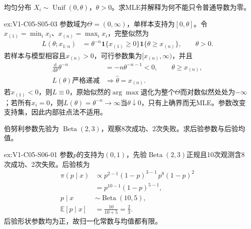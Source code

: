 \begin{SLChapterExercisePairSection}
\begin{exercise}\label{ex:V1-C05-S05-03}
均匀分布 $X_i\sim\operatorname{Unif}(0,\theta)$，$\theta>0$。求MLE并解释为何不能只令普通导数为零。
\end{exercise}
\label{sol:V1-C05-S05-03}
\begin{chapterexercisesolution}{ex:V1-C05-S05-03}
参数域为$\Theta=(0,\infty)$，单样本支持为$[0,\theta]$。令$x_{(1)}=\min_i x_i$、$x_{(n)}=\max_i x_i$，完整似然为
\[
\begin{aligned}
L(\theta;x_{1:n})
&=\theta^{-n}\mathbf1\{x_{(1)}\ge0\}
\mathbf1\{\theta\ge x_{(n)}\},\qquad \theta>0.
\end{aligned}
\]
若样本与模型相容且$x_{(n)}>0$，可行参数集为$[x_{(n)},\infty)$，并且
\[
\begin{aligned}
\frac{\mathrm d}{\mathrm d\theta}\theta^{-n}
&=-n\theta^{-n-1}<0,\qquad \theta\ge x_{(n)},\\
L(\theta)\text{严格递减}
&\Longrightarrow \widehat\theta=x_{(n)}.
\end{aligned}
\]
若$x_{(1)}<0$，则$L\equiv0$，原始似然的$\arg\max$退化为整个$\Theta$而对数似然处处为$-\infty$；若所有$x_i=0$，则$L(\theta)=\theta^{-n}\to\infty$当$\theta\downarrow0$，只有上确界而无MLE。参数改变支持集，因此内部驻点法不适用。
\end{chapterexercisesolution}

\begin{exercise}\label{ex:V1-C05-S06-01}
伯努利参数先验为 $\operatorname{Beta}(2,3)$，观察8次成功、2次失败。求后验参数与后验均值。
\end{exercise}
\label{sol:V1-C05-S06-01}
\begin{chapterexercisesolution}{ex:V1-C05-S06-01}
参数$p$的支持为$(0,1)$，先验$\operatorname{Beta}(2,3)$正规且10次观测含8次成功、2次失败。后验核为
\[
\begin{aligned}
\pi(p\mid x)
&\propto p^{2-1}(1-p)^{3-1}\,p^8(1-p)^2\\
&=p^{10-1}(1-p)^{5-1},\\
p\mid x&\sim\operatorname{Beta}(10,5),\\
\mathbb E[p\mid x]&=\frac{10}{10+5}=\frac23.
\end{aligned}
\]
后验形状参数均为正，故归一化常数与均值都有限。
\end{chapterexercisesolution}


\end{SLChapterExercisePairSection}
